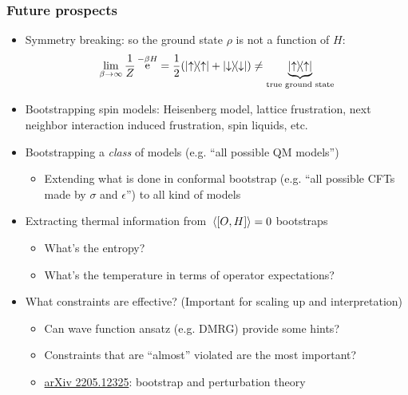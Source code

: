 \documentclass{beamer}
\DeclareMathOperator{\ee}{e}
\begin{document}
\begin{frame}
\frametitle{Future prospects}

\begin{itemize}
    \item Symmetry breaking: so the ground state $\rho$ is not a function of $H$: 
    \begin{equation}
        \lim_{\beta \to \infty} \frac{1}{Z} \ee^{- \beta H} = \frac{1}{2} (\dyad{\uparrow} + \dyad{\downarrow}) \neq \underbrace{\dyad{\uparrow}}_{\text{true ground state}} 
    \end{equation}
    \item Bootstrapping spin models: Heisenberg model, lattice frustration, next neighbor interaction induced frustration, spin liquids, etc.
    \item Bootstrapping a \emph{class} of models (e.g. ``all possible QM models'')
    \begin{itemize}
        \item Extending what is done in conformal bootstrap (e.g. ``all possible CFTs made by $\sigma$ and $\epsilon$'') to all kind of models
    \end{itemize}
    \item Extracting thermal information from $\expval*{\comm{O}{H}} = 0$ bootstraps
    \begin{itemize}
        \item What's the entropy? 
        \item What's the temperature in terms of operator expectations?
    \end{itemize}
    \item What constraints are effective? (Important for scaling up and interpretation)
    \begin{itemize}
        \item Can wave function ansatz (e.g. DMRG) provide some hints?
        \item Constraints that are ``almost'' violated are the most important?
        \item \href{https://arxiv.org/abs/2205.12325}{arXiv 2205.12325}: bootstrap and perturbation theory
    \end{itemize}
\end{itemize}

\end{frame}
\end{document}
